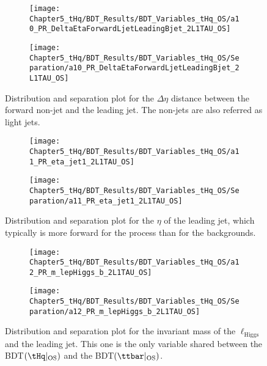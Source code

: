 \begin{figure}[h]
\centering
\begin{subfigure}{.45\textwidth}
  \centering
  \texttt{[image: Chapter5\_tHq/BDT\_Results/BDT\_Variables\_tHq\_OS/a10\_PR\_DeltaEtaForwardLjetLeadingBjet\_2L1TAU\_OS]}
\end{subfigure}%
\begin{subfigure}{.55\textwidth}
  \centering
  \texttt{[image: Chapter5\_tHq/BDT\_Results/BDT\_Variables\_tHq\_OS/Separation/a10\_PR\_DeltaEtaForwardLjetLeadingBjet\_2L1TAU\_OS]}
\end{subfigure}
\caption{Distribution and separation plot for the $\Delta \eta$ distance between the forward non-\btagged jet
and the leading \btagged jet. The non-\btagged jets are also referred as light jets.}
\label{fig:Appendix:BDTVARS:tHqOS:a10_PR_DeltaEtaForwardLjetLeadingBjet}
\end{figure}

\begin{figure}[h]
\centering
\begin{subfigure}{.45\textwidth}
  \centering
  \texttt{[image: Chapter5\_tHq/BDT\_Results/BDT\_Variables\_tHq\_OS/a11\_PR\_eta\_jet1\_2L1TAU\_OS]}
\end{subfigure}%
\begin{subfigure}{.55\textwidth}
  \centering
  \texttt{[image: Chapter5\_tHq/BDT\_Results/BDT\_Variables\_tHq\_OS/Separation/a11\_PR\_eta\_jet1\_2L1TAU\_OS]}
\end{subfigure}
\caption{Distribution and separation plot for the $\eta$ of the leading jet, which typically is more forward for
the \tHq process than for the backgrounds.}
\label{fig:Appendix:BDTVARS:tHqOS:a11_PR_eta_jet1}
\end{figure}

\begin{figure}[h]
\centering
\begin{subfigure}{.45\textwidth}
  \centering
  \texttt{[image: Chapter5\_tHq/BDT\_Results/BDT\_Variables\_tHq\_OS/a12\_PR\_m\_lepHiggs\_b\_2L1TAU\_OS]}
\end{subfigure}%
\begin{subfigure}{.55\textwidth}
  \centering
  \texttt{[image: Chapter5\_tHq/BDT\_Results/BDT\_Variables\_tHq\_OS/Separation/a12\_PR\_m\_lepHiggs\_b\_2L1TAU\_OS]}
\end{subfigure}
\caption{Distribution and separation plot for the invariant mass of the $\ell_{\text{Higgs}}$ and the leading \btagged jet. This one is the 
only variable shared between the BDT$(\tHq|_{\text{OS}})$ and the BDT$(\ttbar|_{\text{OS}})$.}
\label{fig:Appendix:BDTVARS:tHqOS:a12_PR_m_lepHiggs_b}
\end{figure}

